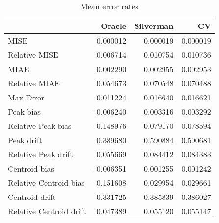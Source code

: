 \begin{table}[H]
\centering
\begin{tabular}{lrrr}
  \hline
 & Oracle & Silverman & CV \\ 
  \hline
MISE & 0.000012 & 0.000019 & 0.000019 \\ 
  Relative MISE & 0.006714 & 0.010754 & 0.010736 \\ 
  MIAE & 0.002290 & 0.002955 & 0.002953 \\ 
  Relative MIAE & 0.054673 & 0.070548 & 0.070488 \\ 
  Max Error & 0.011224 & 0.016640 & 0.016621 \\ 
  Peak bias & -0.006240 & 0.003316 & 0.003292 \\ 
  Relative Peak bias & -0.148976 & 0.079170 & 0.078594 \\ 
  Peak drift & 0.389680 & 0.590884 & 0.590681 \\ 
  Relative Peak drift & 0.055669 & 0.084412 & 0.084383 \\ 
  Centroid bias & -0.006351 & 0.001255 & 0.001242 \\ 
  Relative Centroid bias & -0.151608 & 0.029954 & 0.029661 \\ 
  Centroid drift & 0.331725 & 0.385839 & 0.386027 \\ 
  Relative Centroid drift & 0.047389 & 0.055120 & 0.055147 \\ 
   \hline
\end{tabular}
\caption{Mean error rates} 
\label{tbl:mean_error_rates}
\end{table}
